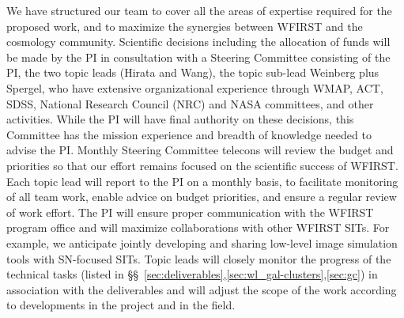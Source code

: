 %
%


 We have structured our team to 
cover all the areas of expertise required for
the proposed work, and to maximize the synergies between WFIRST
and the cosmology community.
Scientific decisions including the allocation of
funds will be made by the PI in consultation with a Steering 
Committee consisting of the PI, the two topic leads (Hirata and Wang),
the topic sub-lead Weinberg plus Spergel, who have extensive organizational experience
through WMAP, ACT, SDSS, National Research Council (NRC) and NASA
committees, and other activities. While the PI will have final authority on these decisions,
this Committee has the mission experience and breadth of knowledge
needed to advise the PI. Monthly Steering 
Committee telecons will review the budget and priorities so that our
effort
remains focused on the scientific success of WFIRST.
Each topic lead will report to the PI on a monthly basis, to facilitate monitoring
of all team work, enable advice on budget priorities, and ensure a
regular review of work effort. The PI will ensure proper
communication with the WFIRST program office and will maximize
collaborations with other WFIRST SITs. For
example, we anticipate jointly developing and sharing low-level image
simulation tools with SN-focused SITs. Topic leads will closely
monitor the progress of the technical tasks (listed in
\S\S~\ref{sec:deliverables},\ref{sec:wl_gal-clusters},\ref{sec:gc}) in
association with the deliverables and will adjust the scope of the
work according to developments in the project and in the field.

